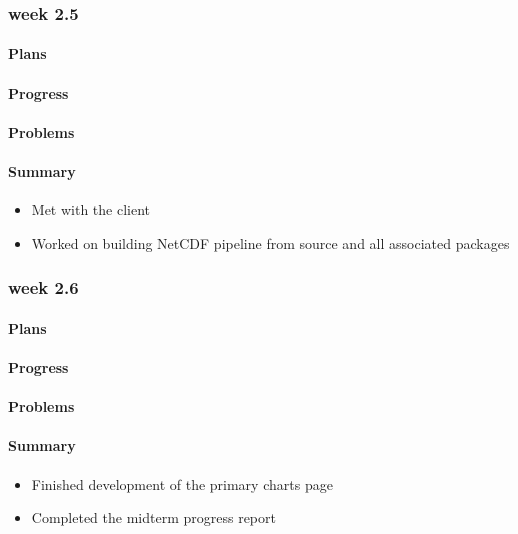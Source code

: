 \documentclass[onecolumn, draftclsnofoot,10pt, compsoc]{article}
\begin{document}
		\subsubsection{week 2.5}
			\paragraph{Plans} \hfill \break

			\paragraph{Progress} \hfill \break

			\paragraph{Problems} \hfill \break

			\paragraph{Summary} \hfill \break
				\begin{itemize}
                    \item Met with the client
                    \item Worked on building NetCDF pipeline from source and all associated packages
                \end{itemize}

		\subsubsection{week 2.6}
			\paragraph{Plans} \hfill \break

			\paragraph{Progress} \hfill \break

			\paragraph{Problems} \hfill \break

			\paragraph{Summary} \hfill \break
				\begin{itemize}
                    \item Finished development of the primary charts page
                    \item Completed the midterm progress report
                \end{itemize}
\end{document}
